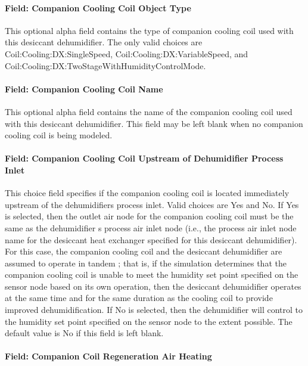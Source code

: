 \paragraph{Field: Companion Cooling Coil Object Type}\label{field-companion-cooling-coil-object-type}

This optional alpha field contains the type of companion cooling coil used with this desiccant dehumidifier. The only valid choices are Coil:Cooling:DX:SingleSpeed, Coil:Cooling:DX:VariableSpeed, and Coil:Cooling:DX:TwoStageWithHumidityControlMode.

\paragraph{Field: Companion Cooling Coil Name}\label{field-companion-cooling-coil-name}

This optional alpha field contains the name of the companion cooling coil used with this desiccant dehumidifier. This field may be left blank when no companion cooling coil is being modeled.

\paragraph{Field: Companion Cooling Coil Upstream of Dehumidifier Process Inlet}\label{field-companion-cooling-coil-upstream-of-dehumidifier-process-inlet}

This choice field specifies if the companion cooling coil is located immediately upstream of the dehumidifiers process inlet. Valid choices are Yes and No. If Yes is selected, then the outlet air node for the companion cooling coil must be the same as the dehumidifier s process air inlet node (i.e., the process air inlet node name for the desiccant heat exchanger specified for this desiccant dehumidifier). For this case, the companion cooling coil and the desiccant dehumidifier are assumed to operate in tandem ; that is, if the simulation determines that the companion cooling coil is unable to meet the humidity set point specified on the sensor node based on its own operation, then the desiccant dehumidifier operates at the same time and for the same duration as the cooling coil to provide improved dehumidification. If No is selected, then the dehumidifier will control to the humidity set point specified on the sensor node to the extent possible. The default value is No if this field is left blank.

\paragraph{Field: Companion Coil Regeneration Air Heating}\label{field-companion-coil-regeneration-air-heating}

